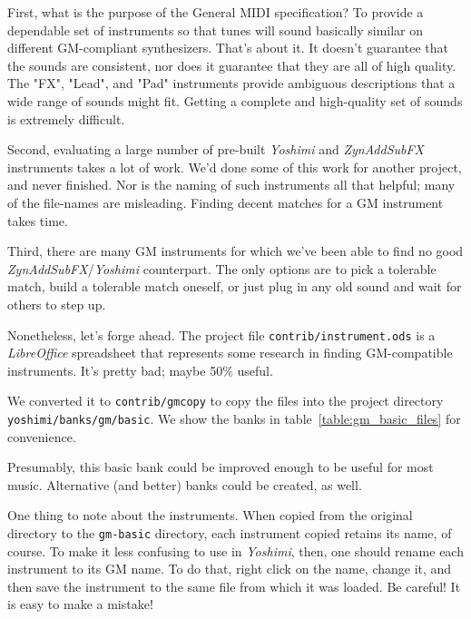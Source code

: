    First, what is the purpose of the General MIDI specification?
   To provide a
   dependable set of instruments so that tunes will sound basically similar
   on different GM-compliant synthesizers.  That's about it.  It doesn't
   guarantee that the sounds are consistent, nor does it guarantee that they
   are all of high quality.  The "FX", "Lead", and "Pad" instruments provide
   ambiguous descriptions that a wide range of sounds might fit.
   Getting a complete and high-quality set of sounds is extremely difficult.

   Second, evaluating a large number of pre-built \textsl{Yoshimi} and
   \textsl{ZynAddSubFX} instruments takes a lot of
   work.  We'd done some of this work for another project, and never
   finished.  Nor is the naming of such instruments all that helpful; many
   of the file-names are misleading.  Finding decent matches for a GM
   instrument takes time.

   Third, there are many GM instruments for which we've been able to find no
   good \textsl{ZynAddSubFX}/\textsl{Yoshimi} counterpart.  The only options
   are to pick a tolerable match, build a tolerable match oneself, or just
   plug in any old sound and wait for others to step up.

   Nonetheless, let's forge ahead.  The project file
   \texttt{contrib/instrument.ods}
   is a \textsl{LibreOffice} spreadsheet
   that represents some research in finding GM-compatible instruments.
   It's pretty bad; maybe 50\% useful.

   We converted it to \texttt{contrib/gmcopy} to copy the files
   into the project directory \texttt{yoshimi/banks/gm/basic}.
   We show the banks in table~\ref{table:gm_basic_files}
   for convenience.




   Presumably, this basic bank could be improved enough to be useful
   for most music.  Alternative (and better) banks could be created, as
   well.

   One thing to note about the instruments.  When copied from the original
   directory to the \texttt{gm-basic} directory, each instrument copied
   retains its name, of course.  To make it less confusing to use in
   \textsl{Yoshimi}, then, one should rename each instrument to its GM name.
   To do that, right click on the name, change it, and then save the
   instrument to the same file from which it was loaded.  Be careful!
   It is easy to make a mistake!  

